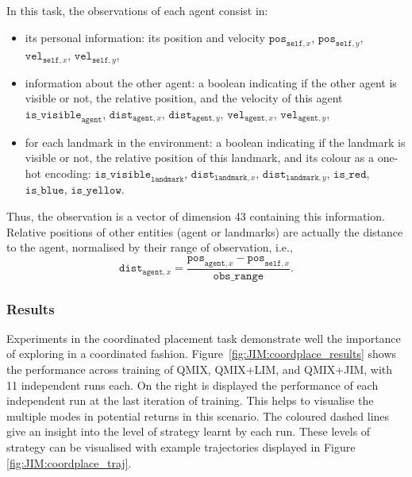 In this task, the observations of each agent consist in:
\begin{itemize}
    \item its personal information: its position and velocity $\mathtt{pos}_{\mathtt{self},x}$, $\mathtt{pos}_{\mathtt{self},y}$, $\mathtt{vel}_{\mathtt{self},x}$, $\mathtt{vel}_{\mathtt{self},y}$,
    \item information about the other agent: a boolean indicating if the other agent is visible or not, the relative position, and the velocity of this agent $\mathtt{is\_visible}_{\mathtt{agent}}$, $\mathtt{dist}_{\mathtt{agent},x}$, $\mathtt{dist}_{\mathtt{agent},y}$, $\mathtt{vel}_{\mathtt{agent},x}$, $\mathtt{vel}_{\mathtt{agent},y}$,
    \item for each landmark in the environment: a boolean indicating if the landmark is visible or not, the relative position of this landmark, and its colour as a one-hot encoding: $\mathtt{is\_visible}_{\mathtt{landmark}}$, $\mathtt{dist}_{\mathtt{landmark},x}$, $\mathtt{dist}_{\mathtt{landmark},y}$, $\mathtt{is\_red}$, $\mathtt{is\_blue}$, $\mathtt{is\_yellow}$.
\end{itemize}
Thus, the observation is a vector of dimension 43 containing this information. Relative positions of other entities (agent or landmarks) are actually the distance to the agent, normalised by their range of observation, i.e., 
$$\mathtt{dist}_{\mathtt{agent},x}=\frac{\mathtt{pos}_{\mathtt{agent},x}-\mathtt{pos}_{\mathtt{self},x}}{\mathtt{obs\_range}}.$$


\subsubsection{Results}

Experiments in the coordinated placement task demonstrate well the importance of exploring in a coordinated fashion. Figure~\ref{fig:JIM:coordplace_results} shows the performance across training of QMIX, QMIX+LIM, and QMIX+JIM, with 11 independent runs each. On the right is displayed the performance of each independent run at the last iteration of training. This helps to visualise the multiple modes in potential returns in this scenario. The coloured dashed lines give an insight into the level of strategy learnt by each run. These levels of strategy can be visualised with example trajectories displayed in Figure \ref{fig:JIM:coordplace_traj}. 

